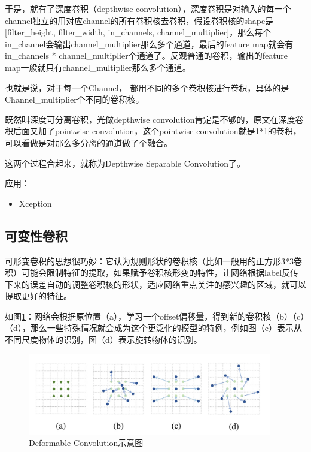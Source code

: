 于是，就有了深度卷积（depthwise convolution），深度卷积是对输入的每一个channel独立的用对应channel的所有卷积核去卷积，假设卷积核的shape是[filter\_height, filter\_width, in\_channels, channel\_multiplier]，那么每个in\_channel会输出channel\_multiplier那么多个通道，最后的feature map就会有in\_channels * channel\_multiplier个通道了。反观普通的卷积，输出的feature map一般就只有channel\_multiplier那么多个通道。

也就是说，对于每一个Channel， 都用不同的多个卷积核进行卷积，具体的是Channel\_multiplier个不同的卷积核。

既然叫深度可分离卷积，光做depthwise convolution肯定是不够的，原文在深度卷积后面又加了pointwise convolution，这个pointwise convolution就是1*1的卷积，可以看做是对那么多分离的通道做了个融合。

这两个过程合起来，就称为Depthwise Separable Convolution了。

应用：
\begin{itemize}
\item Xception
\end{itemize}

\subsection{可变性卷积}

可形变卷积的思想很巧妙：它认为规则形状的卷积核（比如一般用的正方形3*3卷积）可能会限制特征的提取，如果赋予卷积核形变的特性，让网络根据label反传下来的误差自动的调整卷积核的形状，适应网络重点关注的感兴趣的区域，就可以提取更好的特征。

如图\ref{DeformableConv0}：网络会根据原位置（a），学习一个offset偏移量，得到新的卷积核（b）（c）（d），那么一些特殊情况就会成为这个更泛化的模型的特例，例如图（c）表示从不同尺度物体的识别，图（d）表示旋转物体的识别。

\begin{figure}[!htbp]
\centering
\includegraphics[width=0.95\textwidth]{DLTips/DeformableConv0.jpg}
\caption{Deformable Convolution示意图}
\label{DeformableConv0}
\end{figure}

